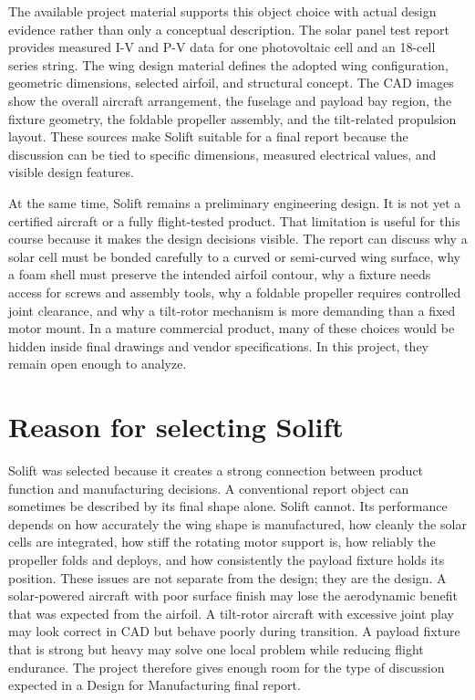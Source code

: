 The available project material supports this object choice with actual design evidence rather than only a conceptual description. The solar panel test report provides measured I-V and P-V data for one photovoltaic cell and an 18-cell series string. The wing design material defines the adopted wing configuration, geometric dimensions, selected airfoil, and structural concept. The CAD images show the overall aircraft arrangement, the fuselage and payload bay region, the fixture geometry, the foldable propeller assembly, and the tilt-related propulsion layout. These sources make Solift suitable for a final report because the discussion can be tied to specific dimensions, measured electrical values, and visible design features.

At the same time, Solift remains a preliminary engineering design. It is not yet a certified aircraft or a fully flight-tested product. That limitation is useful for this course because it makes the design decisions visible. The report can discuss why a solar cell must be bonded carefully to a curved or semi-curved wing surface, why a foam shell must preserve the intended airfoil contour, why a fixture needs access for screws and assembly tools, why a foldable propeller requires controlled joint clearance, and why a tilt-rotor mechanism is more demanding than a fixed motor mount. In a mature commercial product, many of these choices would be hidden inside final drawings and vendor specifications. In this project, they remain open enough to analyze.

\section{Reason for selecting Solift}
\label{subsec:selection-reason}

Solift was selected because it creates a strong connection between product function and manufacturing decisions. A conventional report object can sometimes be described by its final shape alone. Solift cannot. Its performance depends on how accurately the wing shape is manufactured, how cleanly the solar cells are integrated, how stiff the rotating motor support is, how reliably the propeller folds and deploys, and how consistently the payload fixture holds its position. These issues are not separate from the design; they are the design. A solar-powered aircraft with poor surface finish may lose the aerodynamic benefit that was expected from the airfoil. A tilt-rotor aircraft with excessive joint play may look correct in CAD but behave poorly during transition. A payload fixture that is strong but heavy may solve one local problem while reducing flight endurance. The project therefore gives enough room for the type of discussion expected in a Design for Manufacturing final report.

